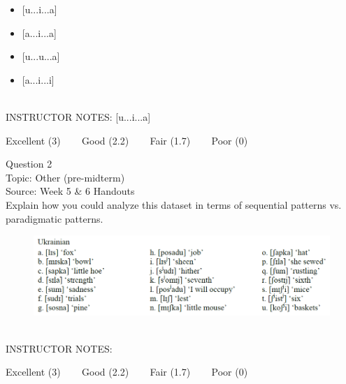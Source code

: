 \documentclass[12pt]{article}
\begin{document}
\begin{itemize} \item {[u...i...a]} \item {[a...i...a]} \item {[u...u...a]} \item {[a...i...i]} \end{itemize}


~\\
INSTRUCTOR NOTES: [u...i...a]


\vfill
Excellent (3) ~~~ Good (2.2) ~~~ Fair (1.7) ~~~ Poor (0)
\newpage

{\large Question 2}\\

Topic: Other (pre-midterm)\\
Source: Week 5 \& 6 Handouts\\

Explain how you could analyze this dataset in terms of sequential patterns vs. paradigmatic patterns.\\

\begin{figure}[H]
\includegraphics{../images/ukrainian.png}
\end{figure}

~\\
INSTRUCTOR NOTES: 


\vfill
Excellent (3) ~~~ Good (2.2) ~~~ Fair (1.7) ~~~ Poor (0)
\newpage

\begin{center}
\textbf{{\color{red}{\HUGE END OF EXAM}}}\\

\end{center}
\newpage

\begin{center}
\textbf{{\color{blue}{\HUGE START OF EXAM\\}}}

\textbf{{\color{blue}{\HUGE Student ID: 16922\\}}}

\textbf{{\color{blue}{\HUGE 4:50\\}}}

\end{center}
\newpage
\end{document}
